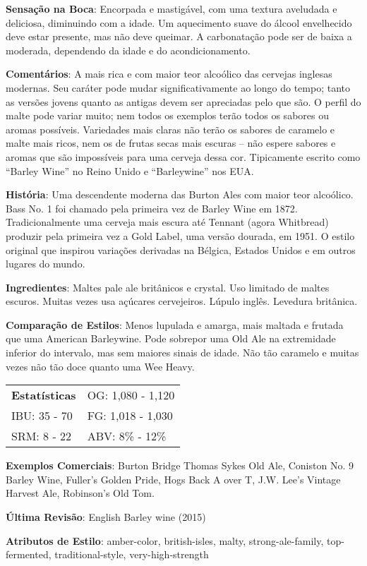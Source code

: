 \textbf{Sensação na Boca}: Encorpada e mastigável, com uma textura aveludada e deliciosa, diminuindo com a idade. Um aquecimento suave do álcool envelhecido deve estar presente, mas não deve queimar. A carbonatação pode ser de baixa a moderada, dependendo da idade e do acondicionamento.

\textbf{Comentários}: A mais rica e com maior teor alcoólico das cervejas inglesas modernas. Seu caráter pode mudar significativamente ao longo do tempo; tanto as versões jovens quanto as antigas devem ser apreciadas pelo que são. O perfil do malte pode variar muito; nem todos os exemplos terão todos os sabores ou aromas possíveis. Variedades mais claras não terão os sabores de caramelo e malte mais ricos, nem os de frutas secas mais escuras – não espere sabores e aromas que são impossíveis para uma cerveja dessa cor. Tipicamente escrito como “Barley Wine” no Reino Unido e “Barleywine” nos EUA.

\textbf{História}: Uma descendente moderna das Burton Ales com maior teor alcoólico. Bass No. 1 foi chamado pela primeira vez de Barley Wine em 1872. Tradicionalmente uma cerveja mais escura até Tennant (agora Whitbread) produzir pela primeira vez a Gold Label, uma versão dourada, em 1951. O estilo original que inspirou variações derivadas na Bélgica, Estados Unidos e em outros lugares do mundo.

\textbf{Ingredientes}: Maltes pale ale britânicos e crystal. Uso limitado de maltes escuros. Muitas vezes usa açúcares cervejeiros. Lúpulo inglês. Levedura britânica.

\textbf{Comparação de Estilos}: Menos lupulada e amarga, mais maltada e frutada que uma American Barleywine. Pode sobrepor uma Old Ale na extremidade inferior do intervalo, mas sem maiores sinais de idade. Não tão caramelo e muitas vezes não tão doce quanto uma Wee Heavy.

\begin{tabular}{@{}p{35mm}p{35mm}@{}}
  \textbf{Estatísticas} & OG: 1,080 - 1,120 \\
  IBU: 35 - 70  & FG: 1,018 - 1,030  \\
  SRM: 8 - 22  & ABV: 8\% - 12\%
\end{tabular}

\textbf{Exemplos Comerciais}: Burton Bridge Thomas Sykes Old Ale, Coniston No. 9 Barley Wine, Fuller’s Golden Pride, Hogs Back A over T, J.W. Lee’s Vintage Harvest Ale, Robinson’s Old Tom.

\textbf{Última Revisão}: English Barley wine (2015)


\textbf{Atributos de Estilo}: amber-color, british-isles, malty, strong-ale-family, top-fermented, traditional-style, very-high-strength

